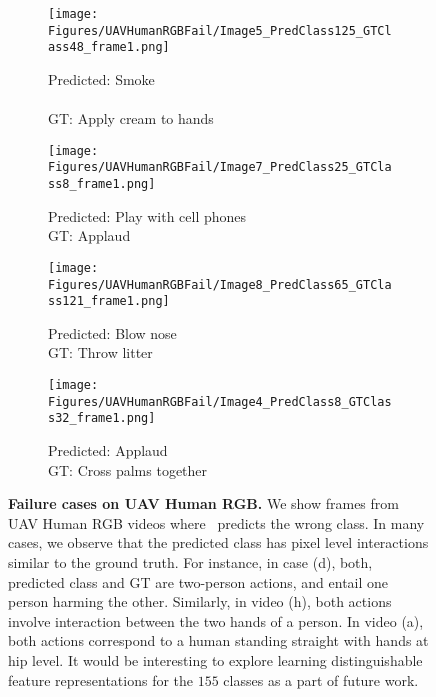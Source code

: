 \documentclass[runningheads]{llncs}
\begin{document}
\begin{figure*}[t]
    \begin{subfigure}[b]{0.24\textwidth}
    \texttt{[image: Figures/UAVHumanRGBFail/Image5\_PredClass125\_GTClass48\_frame1.png]}
    \caption{Predicted: Smoke \\ \\ GT: Apply cream to hands}
    \end{subfigure}
    \begin{subfigure}[b]{0.24\textwidth}
    \texttt{[image: Figures/UAVHumanRGBFail/Image7\_PredClass25\_GTClass8\_frame1.png]}
    \caption{Predicted: Play with cell phones \\ GT: Applaud \\}
    \end{subfigure}
    \begin{subfigure}[b]{0.24\textwidth}
    \texttt{[image: Figures/UAVHumanRGBFail/Image8\_PredClass65\_GTClass121\_frame1.png]}
    \caption{Predicted: Blow nose \\ GT: Throw litter \\}
    \end{subfigure}
    \begin{subfigure}[b]{0.24\textwidth}
    \texttt{[image: Figures/UAVHumanRGBFail/Image4\_PredClass8\_GTClass32\_frame1.png]}
    \caption{Predicted: Applaud \\ GT: Cross palms together}
    \end{subfigure}
    \caption{\textbf{Failure cases on UAV Human RGB.} We show frames from UAV Human RGB videos where \model~predicts the wrong class. In many cases, we observe that the predicted class has pixel level interactions similar to the ground truth. For instance, in case (d), both, predicted class and GT are two-person actions, and entail one person harming the other. Similarly, in video (h), both actions involve interaction between the two hands of a person. In video (a), both actions correspond to a human standing straight with hands at hip level. It would be interesting to explore learning distinguishable feature representations for the $155$ classes as a part of future work.}
    \label{fig:fail_uavhumanrgb}
    
\end{figure*}

 


\end{document}
